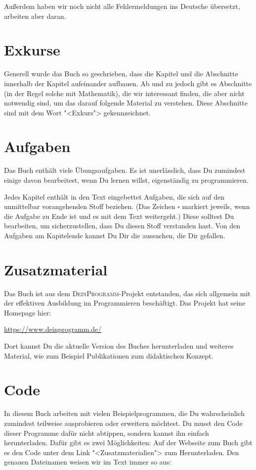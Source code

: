 Außerdem haben wir noch nicht alle Fehlermeldungen ins Deutsche
übersetzt, arbeiten aber daran.

\section{Exkurse}

Generell wurde das Buch so geschrieben, dass die Kapitel und die
Abschnitte innerhalb der Kapitel aufeinander aufbauen.  Ab und zu
jedoch gibt es Abschnitte (in der Regel solche mit Mathematik), die
wir interessant finden, die aber nicht notwendig sind, um das darauf
folgende Material zu verstehen.  Diese Abschnitte sind mit dem Wort
"<Exkurs"> gekennzeichnet.

\section{Aufgaben}

Das Buch enthält viele Übungsaufgaben.  Es ist unerlässlich, dass Du
zumindest einige davon bearbeitest, wenn Du lernen willst,
eigenständig zu programmieren.

Jedes Kapitel enthält in den Text eingebettet Aufgaben, die sich auf
den unmittelbar vorangehenden Stoff beziehen.  (Das Zeichen
\(\square\) markiert jeweils, wenn die Aufgabe zu Ende ist und es mit
dem Text weitergeht.)  Diese solltest Du bearbeiten, um
sicherzustellen, dass Du diesen Stoff verstanden hast.  Von den
Aufgaben am Kapitelende kannst Du Dir die aussuchen, die Dir gefallen.

\section{Zusatzmaterial}

Das Buch ist aus dem \textsc{DeinProgramm}-Projekt entstanden, das
sich allgemein mit der effektiven Ausbildung im Programmieren
beschäftigt.  Das Projekt hat seine Homepage hier:
%
\begin{center}
  \url{https://www.deinprogramm.de/}
\end{center}
%
Dort kannst Du die aktuelle Version des Buches herunterladen und
weiteres Material, wie zum Beispiel Publikationen zum didaktischen
Konzept.

\section{Code}

In diesem Buch arbeiten mit vielen Beispielprogrammen, die Du
wahrscheinlich zumindest teilweise ausprobieren oder erweitern
möchtest.  Du musst den Code dieser Programme dafür nicht abtippen,
sondern kannst ihn einfach herunterladen.  Dafür gibt es zwei
Möglichkeiten: Auf der Webseite zum Buch gibt es den Code unter dem
Link "<Zusatzmaterialien"> zum Herunterladen.  Den genauen Dateinamen
weisen wir im Text immer so aus:


